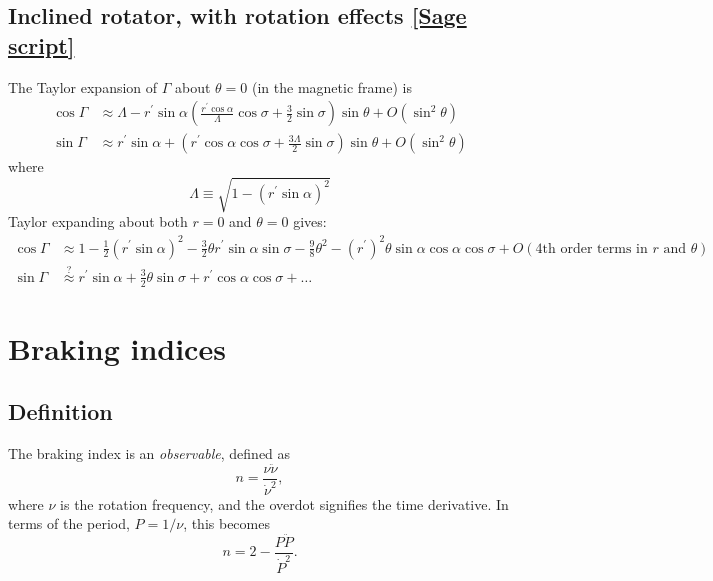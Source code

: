\documentclass{book}
\newcommand{\linktosage}[1]{\hyperref[#1]{[Sage script]}}
\begin{document}
\subsection{Inclined rotator, with rotation effects \linktosage{sage:Gamma}}

The Taylor expansion of $\Gamma$ about $\theta = 0$ (in the magnetic frame) is
\begin{equation}
    \begin{aligned}
        \cos\Gamma &\approx \Lambda - r^\prime\sin\alpha
            \left(\frac{r^\prime\cos\alpha}{\Lambda}\cos\sigma +
                  \frac32\sin\sigma\right)\sin\theta + O(\sin^2\theta) \\
        \sin\Gamma &\approx r^\prime\sin\alpha +
            \left(r^\prime\cos\alpha\cos\sigma + \frac{3\Lambda}{2}\sin\sigma\right)\sin\theta +
            O(\sin^2\theta)
    \end{aligned}
\end{equation}
where
\begin{equation}
    \Lambda \equiv \sqrt{1-(r^\prime\sin\alpha)^2}
\end{equation}
Taylor expanding about both $r = 0$ and $\theta = 0$ gives:
\begin{equation}
    \begin{aligned}
        \cos\Gamma &\approx 1 - \frac12(r^\prime\sin\alpha)^2 -
            \frac32\theta r^\prime\sin\alpha\sin\sigma -
            \frac98\theta^2 - (r^\prime)^2\theta\sin\alpha\cos\alpha\cos\sigma +
            O(\text{4th order terms in $r$ and $\theta$}) \\
        \sin\Gamma &\stackrel{?}{\approx} r^\prime\sin\alpha + \frac32\theta\sin\sigma + r^\prime\cos\alpha\cos\sigma + \dots
    \end{aligned}
\end{equation}

\section{Braking indices}

\subsection{Definition}

The braking index is an \emph{observable}, defined as
\begin{equation}
  n = \frac{\nu\ddot{\nu}}{\dot{\nu}^2},
\end{equation}
where $\nu$ is the rotation frequency, and the overdot signifies the time derivative.
In terms of the period, $P = 1/\nu$, this becomes
\begin{equation}
    n = 2 - \frac{P\ddot{P}}{\dot{P}^2}.
\end{equation}
\end{document}
